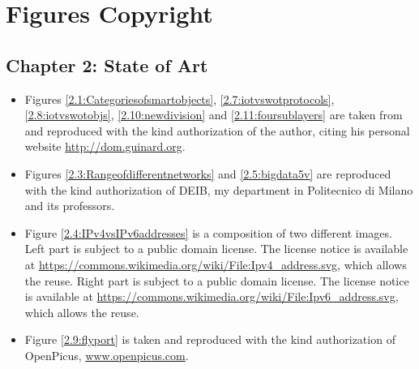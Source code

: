 %
%
\chapter{Figures Copyright}
%
\label{cap:figurescopyright}
%
%
\section*{Chapter 2: State of Art}
\begin{itemize}

	\item Figures \ref{2.1:Categoriesofsmartobjects}, \ref{2.7:iotvswotprotocols}, \ref{2.8:iotvswotobjs}, \ref{2.10:newdivision} and \ref{2.11:foursublayers} are taken from \cite{guinard2011web} and reproduced with the kind authorization of the author, citing his personal website \url{http://dom.guinard.org}.
	
	\item Figures \ref{2.3:Rangeofdifferentnetworks} and \ref{2.5:bigdata5v} are reproduced with the kind authorization of DEIB, my department in Politecnico di Milano and its professors.
	
	\item Figure \ref{2.4:IPv4vsIPv6addresses} is a composition of two different images. Left part is subject to a public domain license. The license notice is available at \url{https://commons.wikimedia.org/wiki/File:Ipv4_address.svg}, which allows the reuse. Right part is subject to a public domain license. The license notice is available at \url{https://commons.wikimedia.org/wiki/File:Ipv6_address.svg}, which allows the reuse.
			
	\item Figure \ref{2.9:flyport} is taken and reproduced with the kind authorization of OpenPicus, \url{www.openpicus.com}.
	
\end{itemize}


